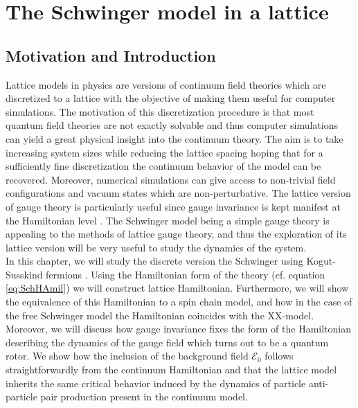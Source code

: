 \chapter{The Schwinger model in a lattice}

\section{Motivation and Introduction}
 
 Lattice models in physics are versions of continuum field theories which are discretized to a lattice with the objective of making them useful for computer simulations. The motivation of this discretization procedure is that most quantum field theories are not exactly solvable and thus computer simulations can yield a great physical insight into the continuum theory. The aim is to take increasing system sizes while reducing the lattice spacing hoping that for a sufficiently fine discretization the continuum behavior of the model can be recovered. Moreover, numerical simulations can give access to non-trivial field configurations and vacuum states which are non-perturbative. The lattice version of gauge theory is particularly useful since gauge invariance is kept manifest at the Hamiltonian level \cite{Kogut1975}. The Schwinger model being a simple gauge theory is appealing to the methods of lattice gauge theory, and thus the exploration of its lattice version will be very useful to study the dynamics of the system.\\

In this chapter, we will study the discrete version the Schwinger using Kogut-Susskind fermions \cite{Kogut1975,Susskind1977}. Using the Hamiltonian form of the theory (cf. equation \eqref{eq:SchHAmil}) we will construct lattice Hamiltonian. Furthermore, we will show the equivalence of this Hamiltonian to a spin chain model, and how in the case of the free Schwinger model the Hamiltonian coincides with the XX-model.\\

Moreover, we will discuss how gauge invariance fixes the form of the Hamiltonian describing the dynamics of the gauge field which turns out to be a quantum rotor. We show how the inclusion of the background field $\mathcal{E}_0$ follows straightforwardly from the continuum Hamiltonian and that the lattice model inherits the same critical behavior induced by the dynamics of particle anti-particle pair production present in the continuum model.\\


